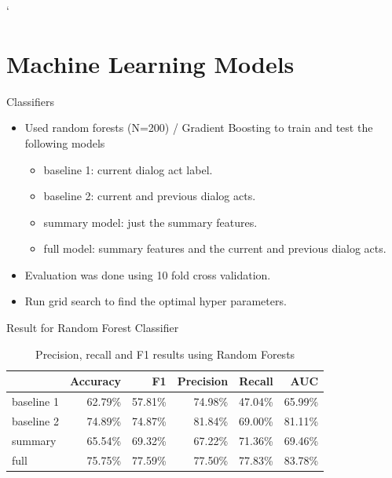 `%

\section{Machine Learning Models}
\frame{\sectionpage}


\begin{frame}{Classifiers}
 \begin{itemize}
  \item Used random forests (N=200) / Gradient Boosting to train and test the following models
  \begin{itemize}
    \item baseline 1: current dialog act label.
    \item baseline 2: current and previous dialog acts.
    \item summary model: just the summary features.
    \item full model: summary features and the current and previous dialog acts.
  \end{itemize}
  \item Evaluation was done using 10 fold cross validation.
  \item Run grid search to find the optimal hyper parameters.
  \end{itemize}
\end{frame}{}

\begin{frame}{Result for Random Forest Classifier}
\begin{table}[ht!]
\begin{center}
\begin{tabular}{lrrrrr}
\hline
{}  &  Accuracy &        F1 &  Precision &    Recall &   AUC \\
\hline
baseline 1 &  62.79\% &  57.81\% &   74.98\% &  47.04\% &  65.99\% \\
baseline 2 &  74.89\% &  74.87\% &   81.84\% &  69.00\% &  81.11\% \\
summary    &  65.54\% &  69.32\% &   67.22\% &  71.36\% &  69.46\% \\
full       &  75.75\% &  77.59\% &   77.50\% &  77.83\% &  83.78\% \\
\hline
\end{tabular}
\end{center}
\caption{Precision, recall and F1 results using Random Forests }
\label{table:result}
\end{table}
\end{frame}

